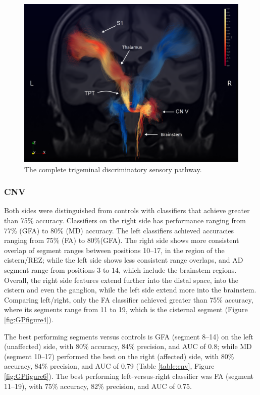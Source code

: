 \begin{figure}[ht]
\centering
\includegraphics[width=\linewidth]{view-left-right.png}
\caption{The complete trigeminal discriminatory sensory pathway. }
\label{fig:GPfigure3}
\end{figure}

\subsubsection{CNV}
Both sides were distinguished from controls with classifiers that achieve greater than 75\% accuracy. 
Classifiers on the right side has performance ranging from 77\% (GFA) to 80\% (MD) accuracy. The left classifiers achieved accuracies ranging from 75\% (FA) to 80\%(GFA). The right side shows more consistent overlap of segment ranges between positions 10--17, in the region of the cistern/REZ; while the left side shows less consistent range overlaps, and AD segment range from positions 3 to 14, which include the brainstem regions. Overall, the right side features extend further into the distal space, into the cistern and even the ganglion, while the left side extend more into the brainstem. Comparing left/right, only the FA classifier achieved greater than 75\% accuracy, where its segments range from 11 to 19, which is the cisternal segment (Figure \ref{fig:GPfigure4}). 

The best performing segments versus controls is GFA (segment 8--14) on the left (unaffected) side, with 80\% accuracy, 84\% precision, and AUC of 0.8; while MD (segment 10--17) performed the best on the right (affected) side, with 80\% accuracy, 84\% precision, and AUC of 0.79 (Table \ref{table:cnv}, Figure \ref{fig:GPfigure6}). The best performing left-versus-right classifier was FA (segment 11--19), with 75\% accuracy, 82\% precision, and AUC of 0.75.

